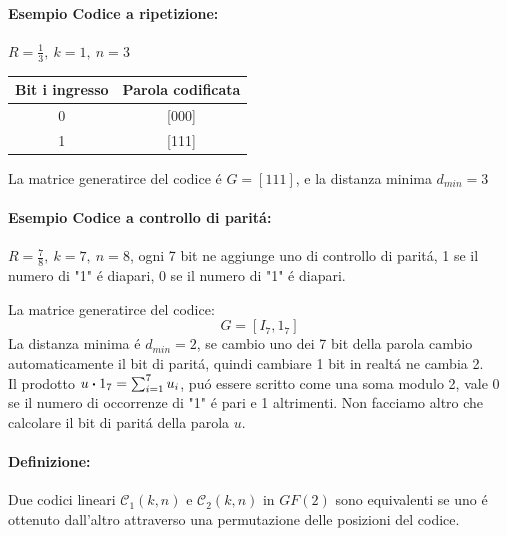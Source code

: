             \paragraph{Esempio Codice a ripetizione:}
            $R = \frac{1}{3},\ k=1,\ n=3$
            \begin{table}[H]
                \centering
                \begin{tabular}{|c|c|}
                \hline
                Bit i  ingresso & Parola codificata \\ \hline
                0               & {[}000{]}         \\ \hline
                1               & {[}111{]}         \\ \hline
                \end{tabular}
            \end{table}
            La matrice generatirce del codice é $G = [111]$, e la distanza minima $d_{min} = 3$\\

            \paragraph{Esempio Codice a controllo di paritá:}
            $R = \frac{7}{8},\ k=7,\ n=8$, ogni 7 bit ne aggiunge uno di controllo di paritá, 1 se il numero di "1" é diapari,
            0 se il numero di "1" é diapari.


            \noindent La matrice generatirce del codice:
            \[
                G = [I_7,1_7]
            \]
            \noindent La distanza minima é $d_{min} = 2$, se cambio uno dei 7 bit della parola
            cambio automaticamente il bit di paritá, quindi cambiare 1 bit in realtá ne cambia 2.\\

            \noindent Il prodotto $u\dotproduct 1_7 = \sum_{i=1}^{7}u_i$, puó essere scritto come una soma modulo 2, vale 0 se il numero di 
            occorrenze di "1" é pari e 1 altrimenti. Non facciamo altro che calcolare il bit di paritá della parola $u$.
            
            \paragraph{Definizione:} Due codici lineari $\mathcal{C}_1(k,n)$ e $\mathcal{C}_2(k,n)$ in $GF(2)$ sono equivalenti se uno é ottenuto dall'altro
            attraverso una permutazione delle posizioni del codice.

